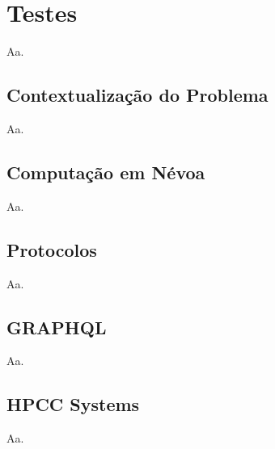 \chapter{Testes}

Aa.

\section{Contextualização do Problema}

Aa.

\section{Computação em Névoa}

Aa.

\section{Protocolos}

Aa.

\section{GRAPHQL}

Aa.

\section{HPCC Systems}

Aa.
